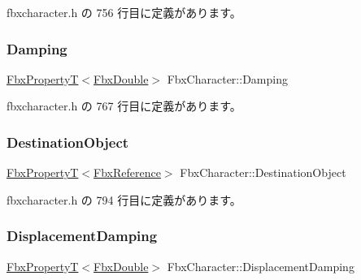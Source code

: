  fbxcharacter.\+h の 756 行目に定義があります。

\mbox{\label{class_fbx_character_a05726b4bade54e987f3581ad1ec31c73}} 
\subsubsection{\texorpdfstring{Damping}{Damping}}
{\footnotesize\ttfamily \hyperlink{class_fbx_property_t}{Fbx\+PropertyT}$<$\hyperlink{fbxtypes_8h_a171e72a1c46fc15c1a6c9c31948c1c5b}{Fbx\+Double}$>$ Fbx\+Character\+::\+Damping}



 fbxcharacter.\+h の 767 行目に定義があります。

\mbox{\label{class_fbx_character_a7157b8566b35af363bdacf25b912c424}} 
\subsubsection{\texorpdfstring{Destination\+Object}{DestinationObject}}
{\footnotesize\ttfamily \hyperlink{class_fbx_property_t}{Fbx\+PropertyT}$<$\hyperlink{fbxtypes_8h_a44df6a2eec915cf27cd481e5c5e48a24}{Fbx\+Reference}$>$ Fbx\+Character\+::\+Destination\+Object}



 fbxcharacter.\+h の 794 行目に定義があります。

\mbox{\label{class_fbx_character_a356196523e3cf619bedb4c6cecd7f94c}} 
\subsubsection{\texorpdfstring{Displacement\+Damping}{DisplacementDamping}}
{\footnotesize\ttfamily \hyperlink{class_fbx_property_t}{Fbx\+PropertyT}$<$\hyperlink{fbxtypes_8h_a171e72a1c46fc15c1a6c9c31948c1c5b}{Fbx\+Double}$>$ Fbx\+Character\+::\+Displacement\+Damping}



